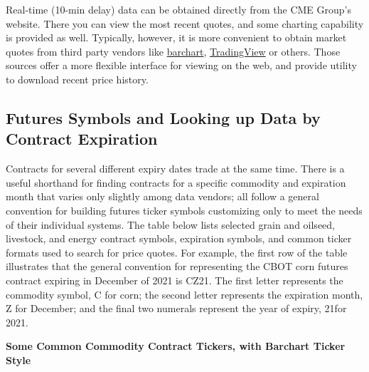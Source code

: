 \documentclass[
  letterpaper,
  DIV=11,
  numbers=noendperiod]{scrreprt}
\begin{document}
Real-time (10-min delay) data can be obtained directly from the CME
Group's website. There you can view the most recent quotes, and some
charting capability is provided as well. Typically, however, it is more
convenient to obtain market quotes from third party vendors like
\href{http://www.barchart.com/futures/marketoverview}{barchart},
\href{https://www.tradingview.com/}{TradingView} or others. Those
sources offer a more flexible interface for viewing on the web, and
provide utility to download recent price history.

\hypertarget{futures-symbols-and-looking-up-data-by-contract-expiration}{%
\subsection{Futures Symbols and Looking up Data by Contract
Expiration}\label{futures-symbols-and-looking-up-data-by-contract-expiration}}

Contracts for several different expiry dates trade at the same time.
There is a useful shorthand for finding contracts for a specific
commodity and expiration month that varies only slightly among data
vendors; all follow a general convention for building futures ticker
symbols customizing only to meet the needs of their individual systems.
The table below lists selected grain and oilseed, livestock, and energy
contract symbols, expiration symbols, and common ticker formats used to
search for price quotes. For example, the first row of the table
illustrates that the general convention for representing the CBOT corn
futures contract expiring in December of 2021 is CZ21. The first letter
represents the commodity symbol, C for corn; the second letter
represents the expiration month, Z for December; and the final two
numerals represent the year of expiry, 21for 2021.

\textbf{Some Common Commodity Contract Tickers, with Barchart Ticker
Style}
\end{document}
